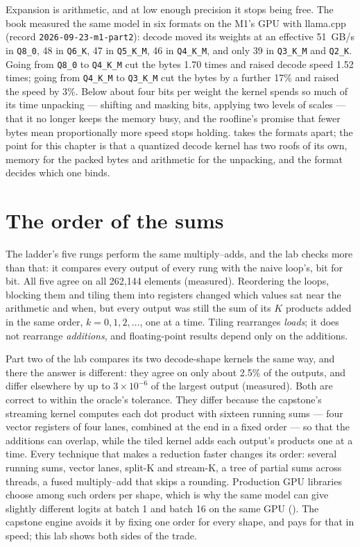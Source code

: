 Expansion is arithmetic, and at low enough precision it stops being free. The
book measured the same model in six formats on the M1's GPU with llama.cpp
(record \texttt{2026-09-23-m1-part2}): decode moved its weights at an effective
51~GB/s in \texttt{Q8\_0}, 48 in \texttt{Q6\_K}, 47 in \texttt{Q5\_K\_M}, 46 in
\texttt{Q4\_K\_M}, and only 39 in \texttt{Q3\_K\_M} and \texttt{Q2\_K}. Going from
\texttt{Q8\_0} to \texttt{Q4\_K\_M} cut the bytes 1.70 times and raised decode speed
1.52 times; going from \texttt{Q4\_K\_M} to \texttt{Q3\_K\_M} cut the bytes by a
further 17\% and raised the speed by 3\%. Below about four bits per weight the
kernel spends so much of its time unpacking --- shifting and masking bits, applying
two levels of scales --- that it no longer keeps the memory busy, and the
roofline's promise that fewer bytes mean proportionally more speed stops holding.
 takes the formats apart; the point for this chapter is
that a quantized decode kernel has two roofs of its own, memory for the packed
bytes and arithmetic for the unpacking, and the format decides which one binds.

\section{The order of the sums}

The ladder's five rungs perform the same multiply--adds, and the lab checks more
than that: it compares every output of every rung with the naive loop's, bit for
bit. All five agree on all 262,144 elements (measured). Reordering the loops,
blocking them and tiling them into registers changed which values sat near the
arithmetic and when, but every output was still the sum of its $K$ products added
in the same order, $k = 0, 1, 2, \ldots$, one at a time. Tiling rearranges
\emph{loads}; it does not rearrange \emph{additions}, and floating-point results
depend only on the additions.

Part two of the lab compares its two decode-shape kernels the same way, and there
the answer is different: they agree on only about 2.5\% of the outputs, and differ
elsewhere by up to $3 \times 10^{-6}$ of the largest output (measured). Both are
correct to within the oracle's tolerance. They differ because the capstone's
streaming kernel computes each dot product with sixteen running sums --- four
vector registers of four lanes, combined at the end in a fixed order --- so that
the additions can overlap, while the tiled kernel adds each output's products one
at a time. Every technique that makes a reduction faster changes its order:
several running sums, vector lanes, split-K and stream-K, a tree of partial sums
across threads, a fused multiply--add that skips a rounding. Production GPU
libraries choose among such orders per shape, which is why the same model can
give slightly different logits at batch 1 and batch 16 on the same GPU
(). The capstone engine avoids it by fixing one order for
every shape, and pays for that in speed; this lab shows both sides of the trade.

